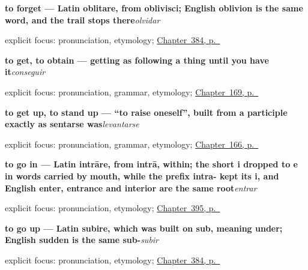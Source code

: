 \noindent\begin{minipage}[t]{\linewidth}
\raggedright
\textbf{to forget — Latin oblitare, from oblivisci; English oblivion is the same word, and the trail stops there}\enspace\emph{olvidar}\par
\footnotesize explicit focus: pronunciation, etymology; \hyperref[ch:enviar-y-subir]{Chapter~384, p.~\pageref*{ch:enviar-y-subir}}
\end{minipage}\par\smallskip

\noindent\begin{minipage}[t]{\linewidth}
\raggedright
\textbf{to get, to obtain — getting as following a thing until you have it}\enspace\emph{conseguir}\par
\footnotesize explicit focus: pronunciation, grammar, etymology; \hyperref[ch:spanish-conseguir]{Chapter~169, p.~\pageref*{ch:spanish-conseguir}}
\end{minipage}\par\smallskip

\noindent\begin{minipage}[t]{\linewidth}
\raggedright
\textbf{to get up, to stand up — \textquotedblleft{}to raise oneself\textquotedblright{}, built from a participle exactly as sentarse was}\enspace\emph{levantarse}\par
\footnotesize explicit focus: pronunciation, grammar, etymology; \hyperref[ch:spanish-open-close-sit-stand]{Chapter~166, p.~\pageref*{ch:spanish-open-close-sit-stand}}
\end{minipage}\par\smallskip

\noindent\begin{minipage}[t]{\linewidth}
\raggedright
\textbf{to go in — Latin intrāre, from intrā, within; the short i dropped to e in words carried by mouth, while the prefix intra- kept its i, and English enter, entrance and interior are the same root}\enspace\emph{entrar}\par
\footnotesize explicit focus: pronunciation, etymology; \hyperref[ch:entrar-y-volver]{Chapter~395, p.~\pageref*{ch:entrar-y-volver}}
\end{minipage}\par\smallskip

\noindent\begin{minipage}[t]{\linewidth}
\raggedright
\textbf{to go up — Latin subire, which was built on sub, meaning under; English sudden is the same sub-}\enspace\emph{subir}\par
\footnotesize explicit focus: pronunciation, etymology; \hyperref[ch:enviar-y-subir]{Chapter~384, p.~\pageref*{ch:enviar-y-subir}}
\end{minipage}\par\smallskip

